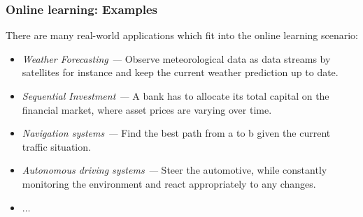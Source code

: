 \documentclass[11pt,compress,t,notes=noshow, xcolor=table]{beamer}
\begin{document}
\begin{frame}
	\frametitle{Online learning: Examples}
	\small
	There are many real-world applications which fit into the online learning scenario:
	\begin{itemize} \small
		  \item \emph{Weather Forecasting ---} Observe meteorological data as data streams by satellites for instance and keep the current weather prediction up to date.
		  \item \emph{Sequential Investment ---} A bank has to allocate its total capital on the financial market, where asset prices are varying over time.
		  \item \emph{Navigation systems ---} Find the best path from a to b given the current traffic situation.
		  \item \emph{Autonomous driving systems ---} Steer the automotive, while constantly monitoring the environment and react appropriately to any changes.
		  \item $\ldots$
%		  
	\end{itemize}
\end{frame}
\end{document}
